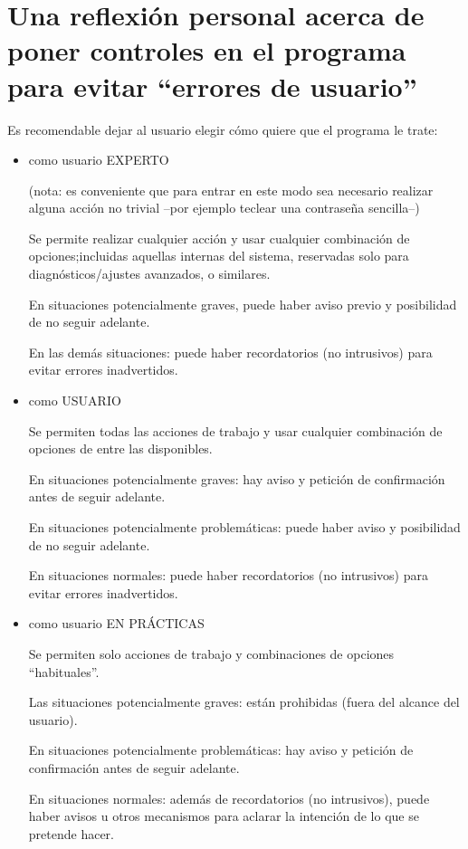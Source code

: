\documentclass[spanish,12pt,a4paper,final,oneside]{book}
\begin{document}
\newpage
\section{Una reflexión personal acerca de poner controles en el programa para evitar ``errores de usuario''}

Es recomendable dejar al usuario elegir cómo quiere que el programa le trate:
\begin{itemize}

\item como usuario EXPERTO

(nota: es conveniente que para entrar en este modo sea necesario realizar alguna acción no trivial --por ejemplo teclear una contraseña sencilla--)

Se permite realizar cualquier acción y usar cualquier combinación de opciones;incluidas aquellas internas del sistema, reservadas solo para diagnósticos/ajustes avanzados, o similares.

En situaciones potencialmente graves, puede haber aviso previo y posibilidad de no seguir adelante.

En las demás situaciones: puede haber recordatorios (no intrusivos) para evitar errores inadvertidos.

\item como USUARIO

Se permiten todas las acciones de trabajo y usar cualquier combinación de opciones de entre las disponibles.

En situaciones potencialmente graves: hay aviso y petición de confirmación antes de seguir adelante.

En situaciones potencialmente problemáticas: puede haber aviso y posibilidad de no seguir adelante.

En situaciones normales: puede haber recordatorios (no intrusivos) para evitar errores inadvertidos.

\item como usuario EN PRÁCTICAS

Se permiten solo acciones de trabajo y combinaciones de opciones ``habituales''.

Las situaciones potencialmente graves: están prohibidas (fuera del alcance del usuario).

En situaciones potencialmente problemáticas: hay aviso y petición de confirmación antes de seguir adelante.

En situaciones normales: además de recordatorios (no intrusivos), puede haber avisos u otros mecanismos para aclarar la intención de lo que se pretende hacer.


\end{itemize}
\end{document}
